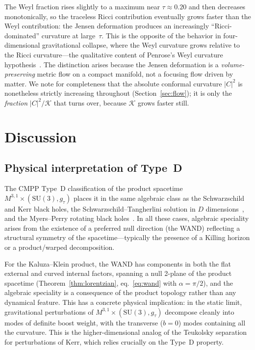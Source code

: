\documentclass[12pt]{article}
\theoremstyle{definition}
\theoremstyle{remark}
\begin{document}
The Weyl fraction rises slightly to a maximum near $\tau\approx0.20$ and then decreases monotonically, so the traceless Ricci contribution eventually grows faster than the Weyl contribution: the Jensen deformation produces an increasingly ``Ricci-dominated'' curvature at large~$\tau$.  This is the opposite of the behavior in four-dimensional gravitational collapse, where the Weyl curvature grows relative to the Ricci curvature---the qualitative content of Penrose's Weyl curvature hypothesis~\cite{Penrose2010CCC}.  The distinction arises because the Jensen deformation is a \emph{volume-preserving} metric flow on a compact manifold, not a focusing flow driven by matter.  We note for completeness that the absolute conformal curvature $|C|^2$ is nonetheless strictly increasing throughout (Section~\ref{sec:flow}); it is only the \emph{fraction} $|C|^2/\mathcal{K}$ that turns over, because $\mathcal{K}$ grows faster still.

\section{Discussion}
\label{sec:discussion}

\subsection{Physical interpretation of Type~D}

The CMPP Type~D classification of the product spacetime $M^{3,1}\times(\mathrm{SU}(3),g_\tau)$ places it in the same algebraic class as the Schwarzschild and Kerr black holes, the Schwarzschild--Tangherlini solution in $D$ dimensions~\cite{EmparanReall2008}, and the Myers--Perry rotating black holes~\cite{MyersPerry1986}.  In all these cases, algebraic speciality arises from the existence of a preferred null direction (the WAND) reflecting a structural symmetry of the spacetime---typically the presence of a Killing horizon or a product/warped decomposition.

For the Kaluza--Klein product, the WAND has components in both the flat external and curved internal factors, spanning a null 2-plane of the product spacetime (Theorem~\ref{thm:lorentzian}, eq.~\eqref{eq:wand} with $\alpha=\pi/2$), and the algebraic speciality is a consequence of the product topology rather than any dynamical feature.  This has a concrete physical implication: in the static limit, gravitational perturbations of $M^{3,1}\times(\mathrm{SU}(3),g_\tau)$ decompose cleanly into modes of definite boost weight, with the transverse ($b=0$) modes containing all the curvature.  This is the higher-dimensional analog of the Teukolsky separation~\cite{Teukolsky1973} for perturbations of Kerr, which relies crucially on the Type~D property.
\end{document}
